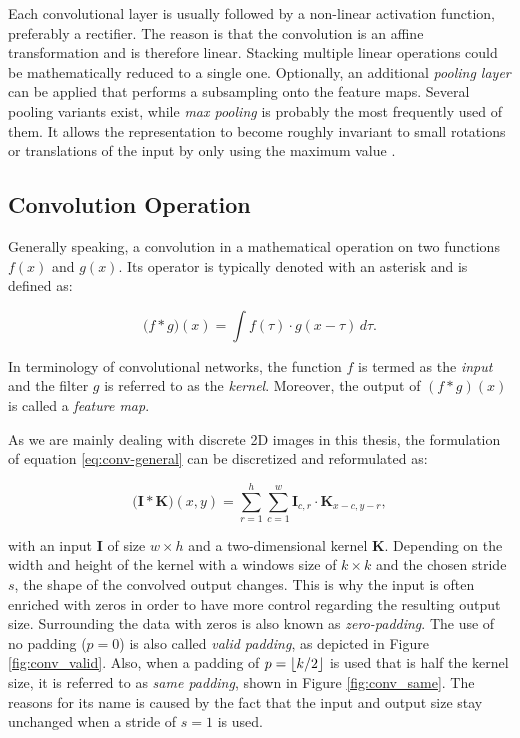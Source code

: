 Each convolutional layer is usually followed by a non-linear activation function, preferably a rectifier. The reason is that the convolution is an affine transformation and is therefore linear. Stacking multiple linear operations could be mathematically reduced to a single one. Optionally, an additional \textit{pooling layer} can be applied that performs a subsampling onto the feature maps. Several pooling variants exist, while \textit{max pooling} is probably the most frequently used of them. It allows the representation to become roughly invariant to small rotations or translations of the input by only using the maximum value \parencite[p. 343]{deep_learning}.


\subsection{Convolution Operation} \label{sec:conv-op}

Generally speaking, a convolution in a mathematical operation on two functions $f(x)$ and $g(x)$. Its operator is typically denoted with an asterisk \parencite[p. 332]{deep_learning} and is defined as:

\begin{equation} \label{eq:conv-general}
  \big(f \ast g\big)(x) = \int f(\tau) \cdot g(x-\tau) \, d\tau .
\end{equation}

In terminology of convolutional networks, the function $f$ is termed as the \textit{input} and the filter $g$ is referred to as the \textit{kernel}. Moreover, the output of $ (f \ast g)(x) $ is called a \textit{feature map}.

As we are mainly dealing with discrete 2D images in this thesis, the formulation of equation \ref{eq:conv-general} can be discretized and reformulated as:

\begin{equation} \label{eq:conv-2d}
  \big(\textbf{I} \ast \textbf{K}\big)(x,y) = \sum\limits_{r=1}^{h} \sum\limits_{c=1}^{w} \textbf{I}_{c,r} \cdot \textbf{K}_{x-c,y-r} ,
\end{equation}

with an input $ \textbf{I} $ of size $w \times h$ and a two-dimensional kernel $ \textbf{K} $. Depending on the width and height of the kernel with a windows size of $ k \times k $ and the chosen stride $ s $, the shape of the convolved output changes. This is why the input is often enriched with zeros in order to have more control regarding the resulting output size. Surrounding the data with zeros is also known as \textit{zero-padding}. The use of no padding ($p=0$) is also called \textit{valid padding}, as depicted in Figure \ref{fig:conv_valid}. Also, when a padding of $p=\lfloor k/2\rfloor$ is used that is half the kernel size, it is referred to as \textit{same padding}, shown in Figure \ref{fig:conv_same}. The reasons for its name is caused by the fact that the input and output size stay unchanged when a stride of $ s=1 $ is used.


